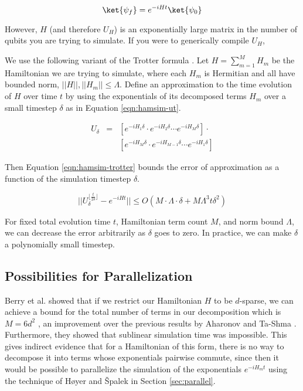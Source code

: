 \begin{equation}
\ket{\psi_f} = e^{-iHt} \ket{\psi_0}
\end{equation}

However, $H$ (and therefore $U_H$)
is an exponentially large matrix in the number of qubits you
are trying to simulate. If you were to generically compile $U_H$, 

We use the following variant of the Trotter formula \cite{Aharonov2003}.
Let $H = \sum_{m=1}^M H_m$ be the Hamiltonian we are trying to simulate, where
each $H_m$ is Hermitian and all have bounded norm, $||H||,||H_m|| \le \Lambda$.
Define an approximation to the time evolution of $H$ over time $t$ by using the
exponentials of its decomposed terms $H_m$ over a small
timestep $\delta$ as in Equation
\ref{eqn:hamsim-ut}.

\begin{eqnarray}
U_\delta & = & [e^{-iH_1 \delta}\cdot e^{-iH_2 \delta} \cdots e^{-iH_M \delta}]\cdot\\
         &   & [e^{-iH_M \delta}\cdot e^{-iH_{M-1} \delta} \cdots e^{-iH_1 \delta}]
\label{eqn:hamsim-ut}
\end{eqnarray}

Then Equation \ref{eqn:hamsim-trotter} bounds the error of approximation
as a function of the simulation timestep $\delta$.

\begin{equation}
||U_{\delta}^{\lfloor \frac{t}{2\delta} \rfloor} - e^{-iHt}||
\le O(M\cdot\Lambda \cdot \delta + M\Lambda^3 t \delta^2)
\label{eqn:hamsim-trotter}
\end{equation}

For fixed total evolution time $t$, Hamiltonian term count $M$,
and norm bound $\Lambda$, we can decrease the error arbitrarily as
$\delta$ goes to zero. In practice, we can make $\delta$ a polynomially
small timestep.

\subsection{Possibilities for Parallelization}

Berry et al. showed that if we restrict our Hamiltonian $H$ to be
$d$-sparse, we can achieve a bound for the total
number of terms in our decomposition which is $M=6d^2$ \cite{Berry2005},
an improvement over the previous results by Aharonov and Ta-Shma
\cite{Aharonov2003}.
Furthermore, they showed that sublinear simulation time was impossible.
This gives indirect evidence that for a Hamiltonian of this form,
there is no way to decompose it into terms whose exponentials
pairwise commute, since then
it would be possible to parallelize the simulation of the
exponentials $e^{-iH_m t}$ using
the technique of H{\o}yer and {\v S}palek in
Section \ref{sec:parallel}.

